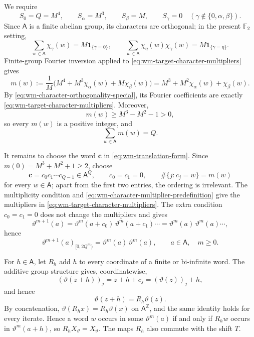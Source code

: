 \documentclass[11pt,reqno,a4paper]{amsart}
\numberwithin{equation}{section}
\theoremstyle{compact}
\theoremstyle{definition}
\theoremstyle{definition}
\begin{document}
We require
\begin{equation}\label{eq:wm-target-character-multipliers}
  S_0=Q=M^4,
  \qquad S_\alpha=M^3,
  \qquad S_\beta=M,
  \qquad S_\gamma=0\quad
  (\gamma\notin\{0,\alpha,\beta\}).
\end{equation}
Since $\mathsf A$ is a finite abelian group, its characters are orthogonal;
in the present $\mathbb F_2$ setting,
\begin{equation}\label{eq:wm-character-orthogonality-special}
  \sum_{w\in\mathsf A}\chi_\gamma(w)=M\mathbf 1_{\{\gamma=0\}},
  \qquad
  \sum_{w\in\mathsf A}\chi_\eta(w)\chi_\gamma(w)
  =M\mathbf 1_{\{\gamma=\eta\}}.
\end{equation}
Finite-group Fourier inversion applied to
\eqref{eq:wm-target-character-multipliers} gives
\begin{equation}\label{eq:wm-multiplicity}
  m(w)
  :=\frac1M\bigl(M^4+M^3\chi_\alpha(w)+M\chi_\beta(w)\bigr)
  =M^3+M^2\chi_\alpha(w)+\chi_\beta(w).
\end{equation}
By \eqref{eq:wm-character-orthogonality-special}, its Fourier coefficients
are exactly \eqref{eq:wm-target-character-multipliers}.  Moreover,
\[
  m(w)\geq M^3-M^2-1>0,
\]
so every $m(w)$ is a positive integer, and
\begin{equation}\label{eq:wm-substitution-length}
  \sum_{w\in\mathsf A}m(w)=Q.
\end{equation}

It remains to choose the word $\mathbf c$ in
\eqref{eq:wm-translation-form}.  Since
$m(0)=M^3+M^2+1\geq2$, choose
\begin{equation}\label{eq:wm-multiplicity-word}
  \mathbf c=c_0c_1\cdots c_{Q-1}\in\mathsf A^Q,
  \qquad
  c_0=c_1=0,
  \qquad
  \#\{j:c_j=w\}=m(w)
\end{equation}
for every $w\in\mathsf A$; apart from the first two entries, the ordering is
irrelevant.  The multiplicity condition and
\eqref{eq:wm-character-multiplier-predefinition} give the multipliers in
\eqref{eq:wm-target-character-multipliers}.  The extra
condition $c_0=c_1=0$ does not change the multipliers and gives
\[
  \vartheta^{m+1}(a)
  =\vartheta^m(a+c_0)\,\vartheta^m(a+c_1)\cdots
  =\vartheta^m(a)\,\vartheta^m(a)\cdots,
\]
hence
\begin{equation}\label{eq:wm-two-copy-prefix}
  \vartheta^{m+1}(a)_{[0,2Q^m)}
  =\vartheta^m(a)\,\vartheta^m(a),
  \qquad a\in\mathsf A,\quad m\geq0.
\end{equation}

For $h\in\mathsf A$, let $R_h$ add $h$ to every coordinate of a finite or
bi-infinite word.  The additive group structure gives, coordinatewise,
\[
  (\vartheta(z+h))_j=z+h+c_j=(\vartheta(z))_j+h,
\]
and hence
\begin{equation}\label{eq:wm-substitution-translation-covariance}
  \vartheta(z+h)=R_h\vartheta(z).
\end{equation}
By concatenation,
$\vartheta(R_hx)=R_h\vartheta(x)$ on $\mathsf A^{\mathbb Z}$, and the same
identity holds for every iterate.  Hence a word $w$ occurs in some
$\vartheta^m(a)$ if and only if $R_hw$ occurs in
$\vartheta^m(a+h)$, so $R_hX_\vartheta=X_\vartheta$.  The maps $R_h$ also
commute with the shift $T$.
\end{document}
